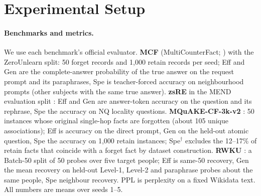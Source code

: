 \documentclass{article}
\theoremstyle{remark}
\theoremstyle{definition}
\begin{document}

\section{Experimental Setup}
\label{sec:setup}

\paragraph{Benchmarks and metrics.}
We use each benchmark's official evaluator. \textbf{MCF} (MultiCounterFact; \citealp{meng2023memit}) with the ZeroUnlearn split: 50 forget records and 1{,}000 retain records per seed; Eff and Gen are the complete-answer probability of the true answer on the request prompt and its paraphrases, Spe is teacher-forced accuracy on neighbourhood prompts (other subjects with the same true answer). \textbf{zsRE} \citep{levy2017zsre} in the MEND evaluation split \citep{mitchell2022mend}: Eff and Gen are answer-token accuracy on the question and its rephrase, Spe the accuracy on NQ locality questions. \textbf{MQuAKE-CF-3k-v2} \citep{zhong2023mquake}: 50 instances whose original single-hop facts are forgotten (about 105 unique associations); Eff is accuracy on the direct prompt, Gen on the held-out atomic question, Spe the accuracy on 1{,}000 retain instances; Spe$^\dagger$ excludes the 12--17\% of retain facts that coincide with a forget fact by dataset construction. \textbf{RWKU} \citep{jin2024rwku}: a Batch-50 split of 50 probes over five target people; Eff is same-50 recovery, Gen the mean recovery on held-out Level-1, Level-2 and paraphrase probes about the same people, Spe neighbour recovery. PPL is perplexity on a fixed Wikidata text. All numbers are means over seeds 1--5.
\end{document}
